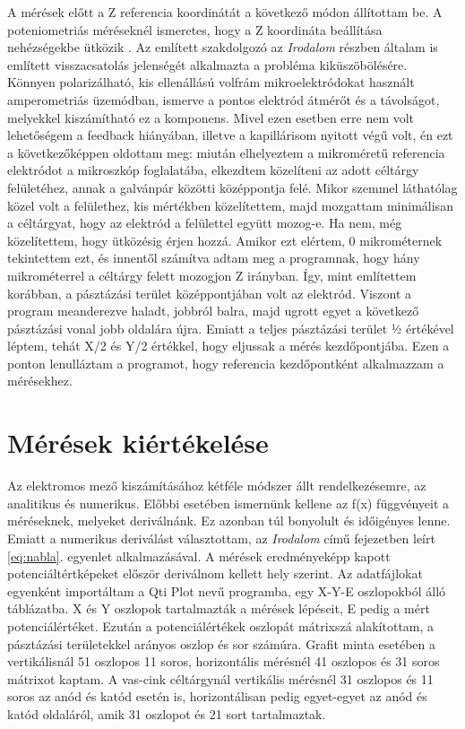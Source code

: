 A mérések előtt a Z referencia koordinátát a következő módon állítottam be. A poteniometriás méréseknél ismeretes, hogy a Z koordináta beállítása nehézségekbe ütközik \cite{Klucsik János Msc Szakdolgozata}. Az említett szakdolgozó az \emph{Irodalom} részben általam is említett visszacsatolás jelenségét alkalmazta a probléma kiküszöbölésére. Könnyen polarizálható, kis ellenállású volfrám mikroelektródokat használt amperometriás üzemódban, ismerve a pontos elektród átmérőt és a távolságot, melyekkel kiszámítható ez a komponens. Mivel ezen esetben erre nem volt lehetőségem a feedback hiányában, illetve a kapillárisom nyitott végű volt, én ezt a következőképpen oldottam meg: miután elhelyeztem a mikroméretű referencia elektródot a mikroszkóp foglalatába, elkezdtem közelíteni az adott céltárgy felületéhez, annak a galvánpár közötti középpontja felé. Mikor szemmel láthatólag közel volt a felülethez, kis mértékben közelítettem, majd mozgattam minimálisan a céltárgyat, hogy az elektród a felülettel együtt mozog-e. Ha nem, még közelítettem, hogy ütközésig érjen hozzá. Amikor ezt elértem, 0 mikrométernek tekintettem ezt, és innentől számítva adtam meg a programnak, hogy hány mikrométerrel a céltárgy felett mozogjon Z irányban. Így, mint említettem korábban, a pásztázási terület középpontjában volt az elektród. Viszont a program meanderezve haladt, jobbról balra, majd ugrott egyet a következő pásztázási vonal jobb oldalára újra.  Emiatt a teljes pásztázási terület ½ értékével léptem, tehát X/2 és Y/2 értékkel, hogy eljussak a mérés kezdőpontjába. Ezen a ponton lenulláztam a programot, hogy referencia kezdőpontként alkalmazzam a mérésekhez.

\section{Mérések kiértékelése}

Az elektromos mező kiszámításához kétféle módszer állt rendelkezésemre, az analitikus és numerikus. Előbbi esetében ismernünk kellene az f(x) függvényeit a méréseknek, melyeket deriválnánk. Ez azonban túl bonyolult és időigényes lenne. Emiatt a numerikus deriválást választottam, az \emph{Irodalom} című fejezetben leírt \ref{eq:nabla}. egyenlet alkalmazásával. A mérések eredményeképp kapott potenciáltértképeket először deriválnom kellett hely szerint. Az adatfájlokat egyenként importáltam a Qti Plot nevű programba, egy X-Y-E oszlopokból álló táblázatba. X és Y oszlopok tartalmazták a mérések lépéseit, E pedig a mért potenciálértéket. Ezután a potenciálértékek oszlopát mátrixszá alakítottam, a pásztázási területekkel arányos oszlop és sor számúra. Grafit minta esetében a vertikálisnál 51 oszlopos 11 soros, horizontális mérésnél 41 oszlopos és 31 soros mátrixot kaptam. A vas-cink céltárgynál vertikális mérésnél 31 oszlopos és 11 soros az anód és katód esetén is, horizontálisan pedig egyet-egyet az anód és katód oldaláról, amik 31 oszlopot és 21 sort tartalmaztak. 

